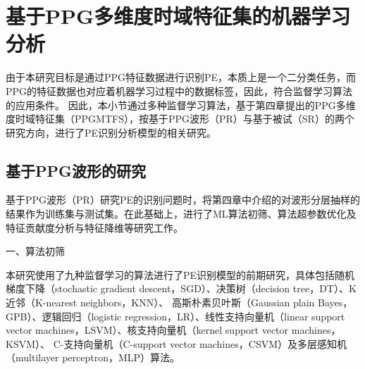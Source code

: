 \section{基于PPG多维度时域特征集的机器学习分析}
由于本研究目标是通过PPG特征数据进行识别PE，本质上是一个二分类任务，而PPG的特征数据也对应着机器学习过程中的数据标签，因此，符合监督学习算法的应用条件。
因此，本小节通过多种监督学习算法，基于第四章提出的PPG多维度时域特征集（PPGMTFS），按基于PPG波形（PR）与基于被试（SR）的两个研究方向，进行了PE识别分析模型的相关研究。

\subsection{基于PPG波形的研究}

基于PPG波形（PR）研究PE的识别问题时，将第四章中介绍的对波形分层抽样的结果作为训练集与测试集。在此基础上，进行了ML算法初筛、算法超参数优化及特征贡献度分析与特征降维等研究工作。

一、算法初筛

本研究使用了九种监督学习的算法进行了PE识别模型的前期研究，具体包括随机梯度下降（stochastic gradient descent，SGD）、决策树（decision tree，DT）、K近邻（K-nearest neighbors，KNN）、
高斯朴素贝叶斯（Gaussian plain Bayes，GPB）、逻辑回归（logistic regression，LR）、线性支持向量机（linear support vector machines，LSVM）、核支持向量机（kernel support vector machines，KSVM）、
C-支持向量机（C-support vector machines，CSVM）及多层感知机（multilayer perceptron，MLP）算法。

